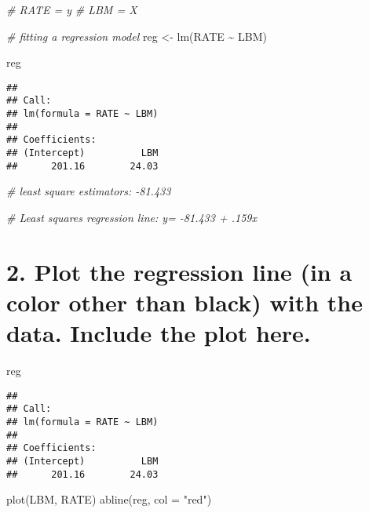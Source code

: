\documentclass[
]{article}
\newenvironment{Shaded}{\begin{snugshade}}{\end{snugshade}}
\newcommand{\AttributeTok}[1]{\textcolor[rgb]{0.77,0.63,0.00}{#1}}
\newcommand{\CommentTok}[1]{\textcolor[rgb]{0.56,0.35,0.01}{\textit{#1}}}
\newcommand{\FunctionTok}[1]{\textcolor[rgb]{0.00,0.00,0.00}{#1}}
\newcommand{\NormalTok}[1]{#1}
\newcommand{\OtherTok}[1]{\textcolor[rgb]{0.56,0.35,0.01}{#1}}
\newcommand{\SpecialCharTok}[1]{\textcolor[rgb]{0.00,0.00,0.00}{#1}}
\newcommand{\StringTok}[1]{\textcolor[rgb]{0.31,0.60,0.02}{#1}}
\begin{document}
\begin{Shaded}
\begin{Highlighting}[]
\CommentTok{\# RATE = y}
\CommentTok{\# LBM = X}

\CommentTok{\# fitting a regression model}
\NormalTok{reg }\OtherTok{\textless{}{-}} \FunctionTok{lm}\NormalTok{(RATE }\SpecialCharTok{\textasciitilde{}}\NormalTok{ LBM)}

\NormalTok{reg}
\end{Highlighting}
\end{Shaded}

\begin{verbatim}
## 
## Call:
## lm(formula = RATE ~ LBM)
## 
## Coefficients:
## (Intercept)          LBM  
##      201.16        24.03
\end{verbatim}

\begin{Shaded}
\begin{Highlighting}[]
\CommentTok{\# least square estimators: {-}81.433}

\CommentTok{\# Least squares regression line: y= {-}81.433 + .159x}
\end{Highlighting}
\end{Shaded}

\hypertarget{plot-the-regression-line-in-a-color-other-than-black-with-the-data.-include-the-plot-here.}{%
\section{2. Plot the regression line (in a color other than black) with
the data. Include the plot
here.}\label{plot-the-regression-line-in-a-color-other-than-black-with-the-data.-include-the-plot-here.}}

\begin{Shaded}
\begin{Highlighting}[]
\NormalTok{reg}
\end{Highlighting}
\end{Shaded}

\begin{verbatim}
## 
## Call:
## lm(formula = RATE ~ LBM)
## 
## Coefficients:
## (Intercept)          LBM  
##      201.16        24.03
\end{verbatim}

\begin{Shaded}
\begin{Highlighting}[]
\FunctionTok{plot}\NormalTok{(LBM, RATE)}
\FunctionTok{abline}\NormalTok{(reg, }\AttributeTok{col =} \StringTok{"red"}\NormalTok{)}
\end{Highlighting}
\end{Shaded}
\end{document}
